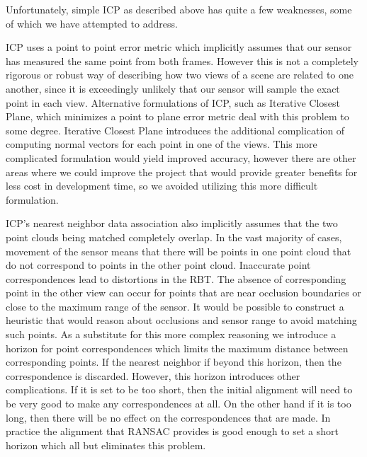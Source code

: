 \documentclass[letterpaper, 10pt, conference]{ieeeconf}
\begin{document}
	Unfortunately, simple ICP as described above has quite a few weaknesses, some of which we have attempted to address.

	ICP uses a point to point error metric which implicitly assumes that our sensor has measured the same point from both frames.  However this is not a completely rigorous or robust way of describing how two views of a scene are related to one another, since it is exceedingly unlikely that our sensor will sample the exact point in each view.  Alternative formulations of ICP, such as Iterative Closest Plane, which minimizes a point to plane error metric deal with this problem to some degree.  Iterative Closest Plane introduces the additional complication of computing normal vectors for each point in one of the views.  This more complicated formulation would yield improved accuracy, however there are other areas where we could improve the project that would provide greater benefits for less cost in development time, so we avoided utilizing this more difficult formulation.

	ICP's nearest neighbor data association also implicitly assumes that the two point clouds being matched completely overlap.  In the vast majority of cases, movement of the sensor means that there will be points in one point cloud that do not correspond to points in the other point cloud.  Inaccurate point correspondences lead to distortions in the RBT.  The absence of corresponding point in the other view can occur for points that are near occlusion boundaries or close to the maximum range of the sensor.  It would be possible to construct a heuristic that would reason about occlusions and sensor range to avoid matching such points.  As a substitute for this more complex reasoning we introduce a horizon for point correspondences which limits the maximum distance between corresponding points.   If the nearest neighbor if beyond this horizon, then the correspondence is discarded.  However, this horizon introduces other complications.  If it is set to be too short, then the initial alignment will need to be very good to make any correspondences at all.  On the other hand if it is too long, then there will be no effect on the correspondences that are made.  In practice the alignment that RANSAC provides is good enough  to set a short horizon which all but eliminates this problem.
\end{document}
